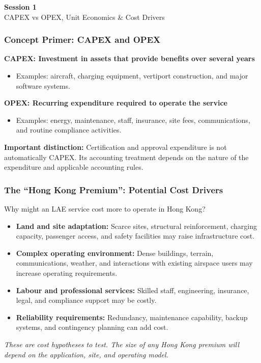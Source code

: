 \documentclass{beamer}
\begin{document}

\begin{frame}[c]
  \begin{center}
    \huge\color{cuhkpurple}\textbf{Session 1}\\
    \vspace{0.5cm}
    \Large CAPEX vs OPEX, Unit Economics \& Cost Drivers
  \end{center}
\end{frame}

\begin{frame}[t]
  \frametitle{Concept Primer: CAPEX and OPEX}
  \textbf{CAPEX: Investment in assets that provide benefits over several years}
  \begin{itemize}
    \item Examples: aircraft, charging equipment, vertiport construction, and major software systems.
  \end{itemize}
  \textbf{OPEX: Recurring expenditure required to operate the service}
  \begin{itemize}
    \item Examples: energy, maintenance, staff, insurance, site fees, communications, and routine compliance activities.
  \end{itemize}
  \vspace{0.2cm}
  \textbf{Important distinction:} Certification and approval expenditure is not automatically CAPEX. Its accounting treatment depends on the nature of the expenditure and applicable accounting rules.
\end{frame}

\begin{frame}[t]
  \frametitle{The ``Hong Kong Premium'': Potential Cost Drivers}
  Why might an LAE service cost more to operate in Hong Kong?
  \begin{itemize}
    \item \textbf{Land and site adaptation:} Scarce sites, structural reinforcement, charging capacity, passenger access, and safety facilities may raise infrastructure cost.
    \item \textbf{Complex operating environment:} Dense buildings, terrain, communications, weather, and interactions with existing airspace users may increase operating requirements.
    \item \textbf{Labour and professional services:} Skilled staff, engineering, insurance, legal, and compliance support may be costly.
    \item \textbf{Reliability requirements:} Redundancy, maintenance capability, backup systems, and contingency planning can add cost.
  \end{itemize}
  \textit{These are cost hypotheses to test. The size of any Hong Kong premium will depend on the application, site, and operating model.}
\end{frame}
\end{document}
